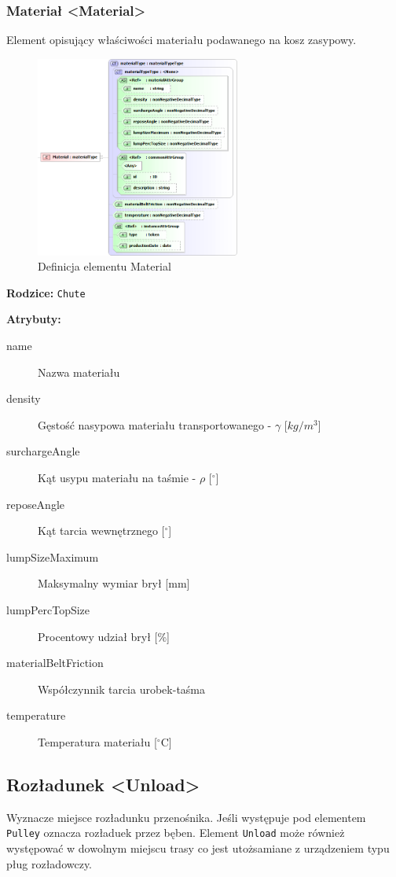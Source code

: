 \documentclass[12pt,a4paper]{article}
\begin{document}
\subsubsection{Materiał <Material>}
Element opisujący właściwości materiału podawanego na kosz zasypowy.

\begin{figure}[H]
  \centering
  \includegraphics[width=0.6\textwidth]{png/liquid/Material}
  \caption{Definicja elementu Material}
  \label{fig:material-xsd}
\end{figure}

\noindent\textbf{Rodzice:} \texttt{Chute}

\noindent\textbf{Atrybuty:}
\begin{description}
\item[name] Nazwa materiału
\item[density] Gęstość nasypowa materiału transportowanego - $\gamma$ [$kg/m^3$]
\item[surchargeAngle] Kąt usypu materiału na taśmie - $\rho$ [$^\circ$]
\item[reposeAngle] Kąt tarcia wewnętrznego [$^\circ$]
\item[lumpSizeMaximum] Maksymalny wymiar brył [mm]
\item[lumpPercTopSize] Procentowy udział brył [\%]
\item[materialBeltFriction] Współczynnik tarcia urobek-taśma
\item[temperature] Temperatura materiału [$^\circ$C]
\end{description}


\subsection{Rozładunek <Unload>}
Wyznacze miejsce rozładunku przenośnika. Jeśli występuje pod elementem {\tt Pulley}
oznacza rozładuek przez bęben.  Element {\tt Unload} może również występować w
dowolnym miejscu trasy co jest utożsamiane z urządzeniem typu pług rozładowczy.
\end{document}
